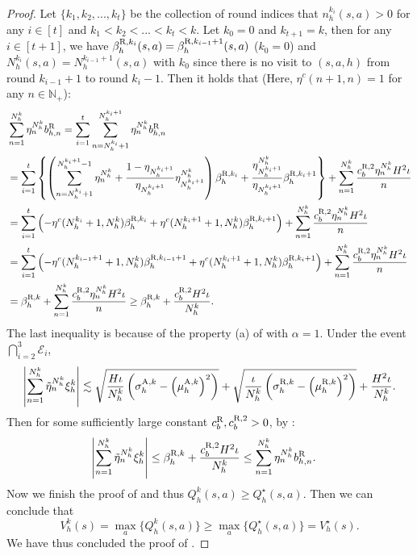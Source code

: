 \documentclass{article}
\newcommand{\R}{\textnormal{R}}
\newcommand{\A}{\textnormal{A}}
\begin{document}
\begin{proof}
    Let $\{k_1,k_2,...,k_t\}$ be the collection of round indices that $n_h^{k_i}(s,a) > 0$ for any $i \in [t]$ and $k_1<k_2<...<k_t < k$. Let $k_0 = 0$ and $k_{t+1} = k$, then for any $i \in [t+1]$, we have $\beta_h^{\R,k_i}(s,a) = \beta_h^{\R,k_{i-1}+1}(s,a)$ ($k_0 = 0$) and $N_h^{k_i}(s,a) = N_h^{k_{i-1}+1}(s,a)$ with $k_0$ since there is no visit to $(s,a,h)$ from round $k_{i-1}+1$ to round $k_i-1$. Then it holds that (Here, $\eta^c(n+1, n) = 1$ for any \( n \in \mathbb{N}_+ \)):
    \begin{align}
    \label{sumrefbonus}
        &\sum_{n=1}^{N_h^k} \eta_n^{N_h^k}b_{h,n}^{\R} = \sum_{i=1}^{t}\sum_{n=N_h^{k_i}+1}^{N_h^{k_i+1}}\eta_n^{N_h^k}b_{h,n}^{\R} \nonumber\\
        & = \sum_{i=1}^{t}\left\{\left(\sum_{n=N_h^{k_i}+1}^{N_h^{k_i+1}-1}\eta_n^{N_h^k} +\frac{1-{\eta_{N_h^{k_i+1}}}}{\eta_{N_h^{k_i+1}}}\eta_{N_h^{k_i+1}}^{N_h^k}\right)\beta_{h}^{\R,k_i} + \frac{\eta_{N_h^{k_i+1}}^{N_h^k}}{\eta_{N_h^{k_i+1}}}\beta_{h}^{\R,k_i+1}\right\}+ \sum_{n=1}^{N_h^k}\frac{c_b^{\R,2}\eta_n^{N_h^k}H^2\iota}{n} \nonumber\\
        & = \sum_{i=1}^{t}\left(-\eta^c(N_h^{k_i}+1,N_h^k)\beta_{h}^{\R,k_i} + \eta^c(N_h^{k_i+1}+1,N_h^k)\beta_{h}^{\R,k_i+1}\right)+ \sum_{n=1}^{N_h^k}\frac{c_b^{\R,2}\eta_n^{N_h^k}H^2\iota}{n} \nonumber\\
        & = \sum_{i=1}^{t}\left(-\eta^c(N_h^{k_{i-1}+1}+1,N_h^k)\beta_{h}^{\R,k_{i-1}+1} + \eta^c(N_h^{k_i+1}+1,N_h^k)\beta_{h}^{\R,k_i+1}\right)+ \sum_{n=1}^{N_h^k}\frac{c_b^{\R,2}\eta_n^{N_h^k}H^2\iota}{n} \nonumber\\
        &=\beta_{h}^{\R,k}+ \sum_{n=1}^{N_h^k}\frac{c_b^{\R,2}\eta_n^{N_h^k}H^2\iota}{n} \geq \beta_{h}^{\R,k} + \frac{c_b^{\R,2}H^2\iota}{N_h^k}.
    \end{align}
    The last inequality is because of the property (a) of  with $\alpha = 1$. Under the event $\bigcap_{i=2}^3 \mathcal{E}_i$,
    $$\left|\sum_{n=1}^{N_h^k} \Tilde{\eta}_n^{N_h^k}\xi_h^k \right| \lesssim \sqrt{\frac{H\iota}{N_h^k}\left(\sigma_h^{\A,k}-\left(\mu_h^{\A,k}\right)^2\right)} +\sqrt{\frac{\iota}{N_h^k}\left(\sigma_h^{\R,k}-\left(\mu_h^{\R,k}\right)^2\right)} + \frac{H^2\iota}{N_h^k}.$$
    Then for some sufficiently large constant $c_b^{\R}, c_b^{\R,2}>0$, by :
    \begin{align*}
        \left|\sum_{n=1}^{N_h^k} \Tilde{\eta}_n^{N_h^k}\xi_h^k \right|& \leq \beta_{h}^{\R,k} + \frac{c_b^{\R,2}H^2\iota}{N_h^k}
        \leq \sum_{n=1}^{N_h^k} \eta_n^{N_h^k}b_{h,n}^{\R}.
    \end{align*}
    Now we finish the proof of  and thus $Q_h^k(s,a) \geq Q_h^{\star}(s,a)$. Then we can conclude that
    $$V_h^k(s) = \max_{a}\{Q_h^k(s,a)\} \geq \max_{a}\{Q_h^{\star}(s,a)\} = V_h^{\star}(s).$$
    We have thus concluded the proof of .
\end{proof}
\end{document}
